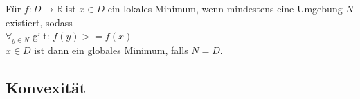 \begin{Def}
Für $f: D\rightarrow \mathbb{R}$ ist $x\in D$ ein lokales Minimum, wenn mindestens eine Umgebung $N$ existiert, sodass \\$\forall_{y\in N}$ gilt: $f(y)>=f(x)$ \\
$x\in D$ ist dann ein globales Minimum, falls $N=D$.
\end{Def}

\subsection{Konvexität}
